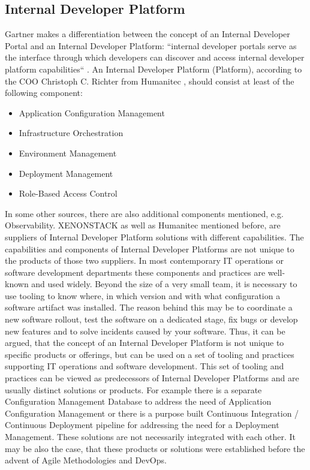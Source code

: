 \documentclass[a4paper,12pt]{article}
\begin{document}
    \subsection{Internal Developer Platform}
    \label{subsec:vpplatform}
    Gartner makes a differentiation between the concept of an Internal Developer Portal and an Internal Developer Platform:
    ``internal developer portals serve as the interface through which developers can discover and
    access internal developer platform capabilities``\parencite{gartner} .
    An Internal Developer Platform (Platform), according to the COO Christoph C. Richter from Humanitec\parencite{richteretal} ,
    should consist at least of the following component:
    \begin{itemize}
        \item Application Configuration Management
        \item Infrastructure Orchestration
        \item Environment Management
        \item Deployment Management
        \item Role-Based Access Control
    \end{itemize}
    In some other sources, there are also additional components mentioned, e.g. Observability\parencite{xenon}.
    XENONSTACK as well as Humanitec mentioned before, are suppliers of Internal Developer Platform solutions with
    different capabilities.
    The capabilities and components of Internal Developer Platforms are not unique to the products of those two suppliers.
    In most contemporary IT operations or software development departments these components and practices are well-known
    and used widely.
    Beyond the size of a very small team, it is necessary to use tooling to know where, in which version and with what
    configuration a software artifact was installed.
    The reason behind this may be to coordinate a new software rollout, test the software on a dedicated stage, fix bugs
    or develop new features and to solve incidents caused by your software.
    Thus, it can be argued, that the concept of an Internal Developer Platform is not unique to specific products
    or offerings, but can be used on a set of tooling and practices supporting IT operations and software development.
    This set of tooling and practices can be viewed as predecessors of Internal Developer Platforms and are usually
    distinct solutions or products.
    For example there is a separate Configuration Management Database
    to address the need of Application Configuration Management or there is a purpose built Continuous Integration /
    Continuous Deployment pipeline for addressing the need for a Deployment Management.
    These solutions are not necessarily integrated with each other.
    It may be also the case, that these
    products or solutions were established before the advent of Agile Methodologies and DevOps.
\end{document}
